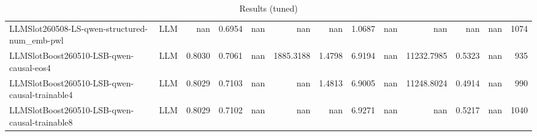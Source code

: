 \begin{table}[htbp]
{\begin{tabular}{ll|rrrrrrrrrr|r}
LLMSlot260508-LS-qwen-structured-num\_emb-pwl & LLM & nan & 0.6954 & nan & nan & nan & 1.0687 & nan & nan & nan & nan & 1074 \\
LLMSlotBoost260510-LSB-qwen-causal-eos4 & LLM & 0.8030 & 0.7061 & nan & 1885.3188 & 1.4798 & 6.9194 & nan & 11232.7985 & 0.5323 & nan & 935 \\
LLMSlotBoost260510-LSB-qwen-causal-trainable4 & LLM & 0.8029 & 0.7103 & nan & nan & 1.4813 & 6.9005 & nan & 11248.8024 & 0.4914 & nan & 990 \\
LLMSlotBoost260510-LSB-qwen-causal-trainable8 & LLM & 0.8029 & 0.7102 & nan & nan & nan & 6.9271 & nan & nan & 0.5217 & nan & 1040 \\
\bottomrule
\end{tabular}
}
\caption{Results (tuned)}
\label{tab:results_tuned}
\end{table}